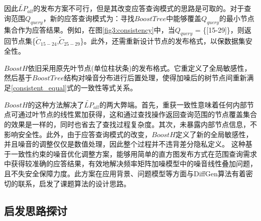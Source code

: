 因此$\widetilde{LP}_{all}$的发布方案不可行，但是其改变应答查询模式的思路是可取的。对于查询范围$Q_{query}$，新的应答查询模式为：寻找$BoostTree$中能够覆盖$Q_{query}$的最小节点集合作为应答结果。例如，在图\ref{fig3:consistency}中，当$Q_{query}$ = \{[15-29]\}，则返回节点集\{$\tilde{C}_{15-24}$,$\tilde{C}_{25-29}$\}。此外，还需重新设计节点的发布格式，以保数据集安全性。

$BoostH$依旧采用原先叶节点(单位柱状条)的发布格式。它重定义了全局敏感性，然后基于$BoostTree$结构对噪音分布进行后置处理，使得加噪后的树节点间重新满足\ref{consistent_equal}式的一致性等式关系。


$BoostH$的这种方法解决了$\widetilde{LP}_{all}$的两大弊端。首先，重获一致性意味着任何内部节点可通过叶节点的线性累加获得，这和通过查找操作返回查询范围的节点覆盖集合的效果是一样的，同时也省去了查找过程复杂度。其次，未暴露内部节点信息，不影响安全性。此外，由于应答查询模式的改变，$BoostH$定义了新的全局敏感性，并且噪音的调整仅仅是数值处理，因此整个过程并不违背差分隐私定义。
这种基于一致性约束的噪音优化调整方案，能够用简单的直方图发布方式在范围查询需求中获得较准确的应答结果，有效地解决频率矩阵加噪模型中的噪音线性叠加问题，且不失安全保障力度。此方案在应用背景、问题模型等方面与DiffGen算法有着密切的联系，启发了课题算法的设计思路。




\subsection{启发思路探讨}

